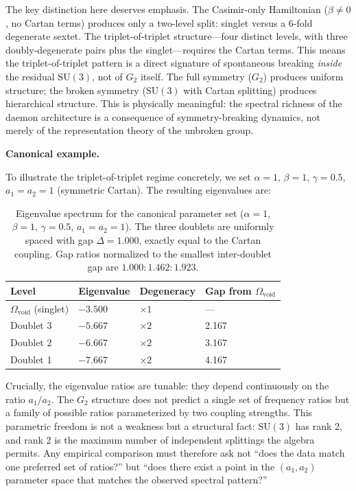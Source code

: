 \documentclass[12pt,a4paper]{article}
\begin{document}
The key distinction here deserves emphasis. The Casimir-only Hamiltonian ($\beta \neq 0$, no Cartan terms) produces only a two-level split: singlet versus a 6-fold degenerate sextet. The triplet-of-triplet structure---four distinct levels, with three doubly-degenerate pairs plus the singlet---requires the Cartan terms. This means the triplet-of-triplet pattern is a direct signature of spontaneous breaking \emph{inside} the residual $\mathrm{SU}(3)$, not of $G_2$ itself. The full symmetry ($G_2$) produces uniform structure; the broken symmetry ($\mathrm{SU}(3)$ with Cartan splitting) produces hierarchical structure. This is physically meaningful: the spectral richness of the daemon architecture is a consequence of symmetry-breaking dynamics, not merely of the representation theory of the unbroken group.

\textbf{Canonical example.}

To illustrate the triplet-of-triplet regime concretely, we set $\alpha = 1$, $\beta = 1$, $\gamma = 0.5$, $a_1 = a_2 = 1$ (symmetric Cartan). The resulting eigenvalues are:

\begin{table}[ht]
\centering
\caption{Eigenvalue spectrum for the canonical parameter set ($\alpha = 1$, $\beta = 1$, $\gamma = 0.5$, $a_1 = a_2 = 1$). The three doublets are uniformly spaced with gap $\Delta = 1.000$, exactly equal to the Cartan coupling. Gap ratios normalized to the smallest inter-doublet gap are $1.000 : 1.462 : 1.923$.}
\label{tab:eigenvalues}
\small
\begin{tabular}{@{}llll@{}}
\toprule
Level & Eigenvalue & Degeneracy & Gap from $\Omega_{\mathrm{void}}$ \\
\midrule
$\Omega_{\mathrm{void}}$ (singlet) & $-3.500$ & $\times 1$ & --- \\
Doublet 3 & $-5.667$ & $\times 2$ & 2.167 \\
Doublet 2 & $-6.667$ & $\times 2$ & 3.167 \\
Doublet 1 & $-7.667$ & $\times 2$ & 4.167 \\
\bottomrule
\end{tabular}
\end{table}

Crucially, the eigenvalue ratios are tunable: they depend continuously on the ratio $a_1/a_2$. The $G_2$ structure does not predict a single set of frequency ratios but a family of possible ratios parameterized by two coupling strengths. This parametric freedom is not a weakness but a structural fact: $\mathrm{SU}(3)$ has rank 2, and rank 2 is the maximum number of independent splittings the algebra permits. Any empirical comparison must therefore ask not ``does the data match one preferred set of ratios?'' but ``does there exist a point in the $(a_1, a_2)$ parameter space that matches the observed spectral pattern?''
\end{document}
